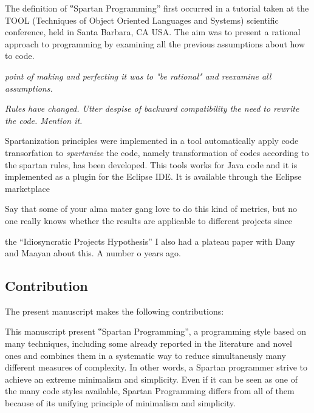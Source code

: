 
The definition of ‟Spartan Programming” first occurred in a tutorial taken at
the TOOL (Techniques of Object Oriented Languages and Systems) scientific conference,
held in Santa Barbara, CA USA. %
The aim was to present a rational approach to programming by examining all the previous
assumptions about how to code.

\emph{point of making and perfecting it was to "be rational" and
reexamine all assumptions.}

\emph{Rules have changed.
Utter despise of backward compatibility the need to rewrite the code.
Mention it.}


Spartanization principles were implemented in a tool automatically apply code transorfation
to \emph{spartanize} the code, namely transformation of codes according to the spartan rules, has been developed.
This tools works for Java code and it is implemented as a plugin for the Eclipse
IDE\@. It is available through the Eclipse marketplace

Say that some of your alma mater gang love to do this kind of metrics, but
no one really knows whether the results are applicable to different projects
since~\cite{Turnu:Concas:Marchesi:Tonelli:11}

the ``Idiosyncratic Projects Hypothesis'' I also had a plateau paper with
Dany and Maayan about this. A number o years ago.\matteo

\subsection{Contribution}

The present manuscript makes the following contributions:

This manuscript present ‟Spartan Programming”, a programming style based on many techniques,
including some already reported in the literature and novel ones and combines them
in a systematic way to reduce simultaneusly many different measures of complexity.
In other words, a Spartan programmer strive to achieve an extreme minimalism and simplicity.
Even if it can be seen as one of the many code styles available, Spartan Programming differs from
all of them because of its unifying principle of minimalism and simplicity.

